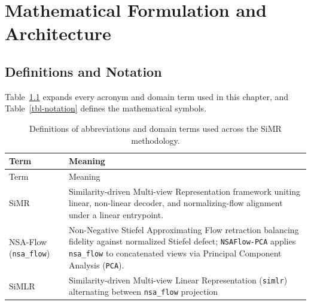 \documentclass[
  10pt,
  letterpaper,
]{report}
\begin{document}

\chapter{Mathematical Formulation and
Architecture}\label{mathematical-formulation-and-architecture}

\section{Definitions and Notation}\label{definitions-and-notation}

Table~\ref{tbl-definitions} expands every acronym and domain term used
in this chapter, and Table~\ref{tbl-notation} defines the mathematical
symbols.

\begin{longtable}[]{@{}
  >{\raggedright\arraybackslash}p{}
  >{\raggedright\arraybackslash}p{}@{}}
\caption{Definitions of abbreviations and domain terms used across the
SiMR methodology.}\label{tbl-definitions}\tabularnewline
\toprule\noalign{}
\begin{minipage}[b]{\linewidth}\raggedright
Term
\end{minipage} & \begin{minipage}[b]{\linewidth}\raggedright
Meaning
\end{minipage} \\
\midrule\noalign{}
\endfirsthead
\toprule\noalign{}
\begin{minipage}[b]{\linewidth}\raggedright
Term
\end{minipage} & \begin{minipage}[b]{\linewidth}\raggedright
Meaning
\end{minipage} \\
\midrule\noalign{}
\endhead
\bottomrule\noalign{}
\endlastfoot
SiMR & Similarity-driven Multi-view Representation framework uniting
linear, non-linear decoder, and normalizing-flow alignment under a
linear entrypoint. \\
NSA-Flow (\texttt{nsa\_flow}) & Non-Negative Stiefel Approximating Flow
retraction balancing fidelity against normalized Stiefel defect;
\texttt{NSAFlow-PCA} applies \texttt{nsa\_flow} to concatenated views
via Principal Component Analysis (\texttt{PCA}). \\
SiMLR & Similarity-driven Multi-view Linear Representation
(\texttt{simlr}) alternating between \texttt{nsa\_flow} projection

\end{longtable}
\end{document}
